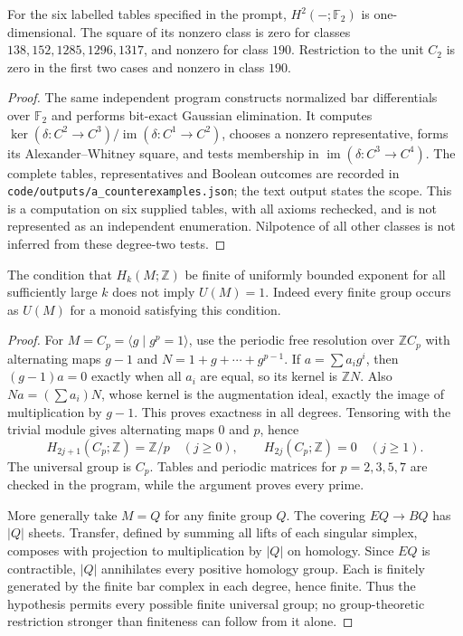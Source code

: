 \begin{proposition}\label{A:six-tests}
For the six labelled tables specified in the prompt, $H^2(-;\mathbb F_2)$ is
one-dimensional. The square of its nonzero class is zero for classes
$138,152,1285,1296,1317$, and nonzero for class $190$. Restriction to the
unit $C_2$ is zero in the first two cases and nonzero in class $190$.
\end{proposition}
\begin{proof}
The same independent program constructs normalized bar differentials over
$\mathbb F_2$ and performs bit-exact Gaussian elimination. It computes
$\ker(\delta:C^2\to C^3)/\operatorname{im}(\delta:C^1\to C^2)$, chooses a
nonzero representative, forms its Alexander--Whitney square, and tests
membership in $\operatorname{im}(\delta:C^3\to C^4)$. The complete tables,
representatives and Boolean outcomes are recorded in
\texttt{code/outputs/a\_counterexamples.json}; the text output states the
scope. This is a computation on six supplied tables, with all axioms
rechecked, and is not represented as an independent enumeration. Nilpotence
of all other classes is not inferred from these degree-two tests.
\end{proof}

\begin{proposition}\label{A:exponent}
The condition that $H_k(M;\mathbb Z)$ be finite of uniformly bounded exponent
for all sufficiently large $k$ does not imply $U(M)=1$. Indeed every finite
group occurs as $U(M)$ for a monoid satisfying this condition.
\end{proposition}
\begin{proof}
For $M=C_p=\langle g\mid g^p=1\rangle$, use the periodic free resolution over
$\mathbb ZC_p$ with alternating maps $g-1$ and
$N=1+g+\cdots+g^{p-1}$. If $a=\sum a_i g^i$, then
$(g-1)a=0$ exactly when all $a_i$ are equal, so its kernel is $\mathbb ZN$.
Also $Na=(\sum a_i)N$, whose kernel is the augmentation ideal, exactly the
image of multiplication by $g-1$. This proves exactness in all degrees.
Tensoring with the trivial module gives alternating maps $0$ and $p$, hence
\[
 H_{2j+1}(C_p;\mathbb Z)=\mathbb Z/p\quad(j\geq0),\qquad
 H_{2j}(C_p;\mathbb Z)=0\quad(j\geq1).
\]
The universal group is $C_p$. Tables and periodic matrices for
$p=2,3,5,7$ are checked in the program, while the argument proves every prime.

More generally take $M=Q$ for any finite group $Q$. The covering
$EQ\to BQ$ has $|Q|$ sheets. Transfer, defined by summing all lifts of each
singular simplex, composes with projection to multiplication by $|Q|$ on
homology. Since $EQ$ is contractible, $|Q|$ annihilates every positive
homology group. Each is finitely generated by the finite bar complex in each
degree, hence finite. Thus the hypothesis permits every possible finite
universal group; no group-theoretic restriction stronger than finiteness
can follow from it alone.
\end{proof}

